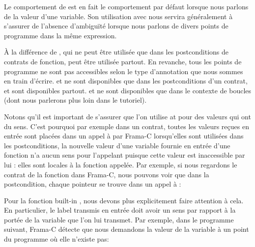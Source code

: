 \begin{Information}
Le comportement de  est en fait le comportement par défaut lorsque
nous parlons de la valeur d'une variable. Son utilisation avec  nous
servira généralement à s'assurer de l'absence d’ambiguïté lorsque nous parlons
de divers points de programme dans la même expression.
\end{Information}


À la différence de , qui ne peut être utilisée que dans les
postconditions de contrats de fonction,  peut être utilisée partout.
En revanche, tous les points de programme ne sont pas accessibles selon le type
d'annotation que nous sommes en train d'écrire.  et  ne sont
disponibles que dans les postconditions d'un contrat,  et 
sont disponibles partout.  et  ne sont
disponibles que dans le contexte de boucles (dont nous parlerons plus loin dans
le tutoriel).


Notons qu'il est important de s'assurer que l'on utilise  at
 pour des valeurs qui ont du sens. C'est pourquoi par
exemple dans un contrat, toutes les valeurs reçues en entrée sont placées dans un
appel à  par Frama-C lorsqu'elles sont utilisées dans
les postconditions, la nouvelle valeur d'une variable fournie en entrée d'une
fonction n'a aucun sens pour l'appelant puisque cette valeur est inaccessible par
lui : elles sont locales à la fonction appelée. Par exemple, si nous regardons le
contrat de la fonction  dans Frama-C, nous pouvons voir que dans
la postcondition, chaque pointeur se trouve dans un appel à  :




Pour la fonction built-in , nous devons plus
explicitement faire attention à cela. En particulier, le label transmis en entrée
doit avoir un sens par rapport à la portée de la variable que l'on lui transmet.
Par exemple, dans le programme suivant, Frama-C détecte que nous demandons la valeur
de la variable  à un point du programme où elle n'existe pas:






